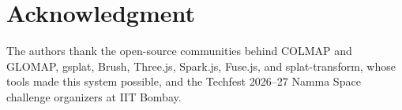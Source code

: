\documentclass[conference]{IEEEtran}
\begin{document}
\section*{Acknowledgment}
The authors thank the open-source communities behind COLMAP and GLOMAP, gsplat, Brush, Three.js, Spark.js, Fuse.js, and splat-transform, whose tools made this system possible, and the Techfest 2026--27 Namma Space challenge organizers at IIT Bombay.

\FloatBarrier


\end{document}
